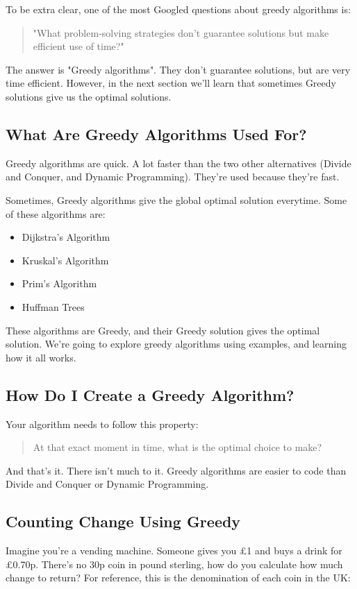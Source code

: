 \documentclass{article}
\begin{document}
To be extra clear, one of the most Googled questions about greedy algorithms is:

\begin{quote}
    "What problem-solving strategies don't guarantee solutions but make efficient use of time?"
\end{quote}

The answer is "Greedy algorithms". They don't guarantee solutions, but are very time efficient. However, in the next section we'll learn that sometimes Greedy solutions give us the optimal solutions.
\newpage
\subsection{What Are Greedy Algorithms Used For?}
Greedy algorithms are quick. A lot faster than the two other alternatives (Divide and Conquer, and Dynamic Programming). They're used because they're fast.

Sometimes, Greedy algorithms give the global optimal solution everytime. Some of these algorithms are:
\begin{itemize}
    \item Dijkstra's Algorithm
    \item Kruskal's Algorithm
    \item Prim's Algorithm
    \item Huffman Trees
\end{itemize}

These algorithms are Greedy, and their Greedy solution gives the optimal solution.
We're going to explore greedy algorithms using examples, and learning how it all works.
\newpage
\subsection{How Do I Create a Greedy Algorithm?}
Your algorithm needs to follow this property:
\begin{quote}
    At that exact moment in time, what is the optimal choice to make?
\end{quote}
And that's it. There isn't much to it. Greedy algorithms are easier to code than Divide and Conquer or Dynamic Programming.
\newpage
\subsection{Counting Change Using Greedy}
Imagine you're a vending machine. Someone gives you £1 and buys a drink for £0.70p. There's no 30p coin in pound sterling, how do you calculate how much change to return?
For reference, this is the denomination of each coin in the UK:
\end{document}
